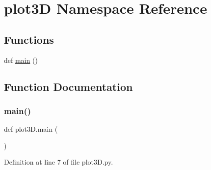 \hypertarget{namespaceplot3_d}{}\section{plot3D Namespace Reference}
\label{namespaceplot3_d}
\subsection*{Functions}
\begin{DoxyCompactItemize}
\item 
def \hyperlink{namespaceplot3_d_aa51f4a0ddf70f649422b2004535b79e9}{main} ()
\end{DoxyCompactItemize}


\subsection{Function Documentation}
\mbox{\label{namespaceplot3_d_aa51f4a0ddf70f649422b2004535b79e9}} 
\subsubsection{\texorpdfstring{main()}{main()}}
{\footnotesize\ttfamily def plot3\+D.\+main (\begin{DoxyParamCaption}{ }\end{DoxyParamCaption})}



Definition at line 7 of file plot3\+D.\+py.

